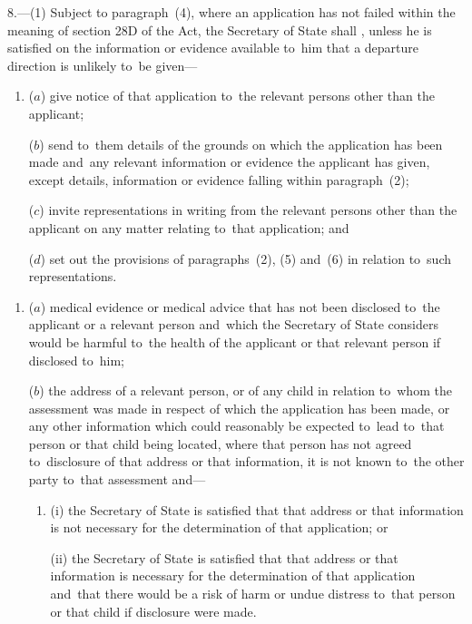 \documentclass[12pt,a4paper]{article}
\begin{document}
8.—(1) Subject to
paragraph~(4), where an application has not failed within the meaning of section
28D of the Act, the Secretary of State shall%
, unless he is satisfied on the information or evidence available to~him that a departure direction is unlikely to~be given—  %
\begin{enumerate}\item[]
($a$) give notice of that application to~the relevant persons other than the
applicant;

($b$) send to~them details of the grounds on which the application has been made
and~any relevant information or evidence the applicant has given, except
details, information or evidence falling within paragraph~(2);

($c$) invite representations in writing from the relevant persons other than the
applicant on any matter relating to~that application; and

($d$) set out the provisions of paragraphs~(2), (5) and~(6) in relation to~such
representations.
\end{enumerate}

\begin{enumerate}\item[]
($a$) medical evidence or medical advice that has not been disclosed to~the
applicant or a relevant person and~which the Secretary of State considers would
be harmful to~the health of the applicant or that relevant person if disclosed
to~him;

($b$) the address of a relevant person, or of any child in relation to~whom the
assessment was made in respect of which the application has been made, or any
other information which could reasonably be expected to~lead to~that person or
that child being located, where that person has not agreed to~disclosure of that
address or that information, it is not known to~the other party to~that
assessment and—
\begin{enumerate}\item[]
(i) the Secretary of State is satisfied that that address or that information is
not necessary for the determination of that application; or

(ii) the Secretary of State is satisfied that that address or that information is
necessary for the determination of that application and~that there would be a
risk of harm or undue distress to~that person or that child if disclosure were
made.
\end{enumerate}
\end{enumerate}
\end{document}
